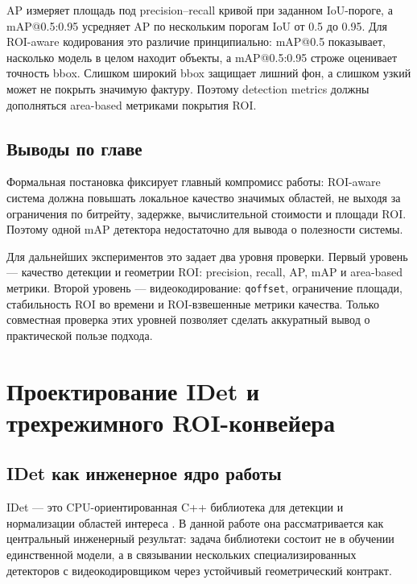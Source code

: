 \documentclass[12pt,a4paper,oneside,openany]{report}
\begin{document}
AP измеряет площадь под precision--recall кривой при заданном IoU-пороге, а mAP@0.5:0.95
усредняет AP по нескольким порогам IoU от 0.5 до 0.95. Для ROI-aware кодирования это различие
принципиально: mAP@0.5 показывает, насколько модель в целом находит объекты, а mAP@0.5:0.95
строже оценивает точность bbox. Слишком широкий bbox защищает лишний фон, а слишком узкий может
не покрыть значимую фактуру. Поэтому detection metrics должны дополняться area-based метриками
покрытия ROI.


\section{Выводы по главе}

Формальная постановка фиксирует главный компромисс работы: ROI-aware система должна повышать
локальное качество значимых областей, не выходя за ограничения по битрейту, задержке,
вычислительной стоимости и площади ROI. Поэтому одной mAP детектора недостаточно для вывода о
полезности системы.

Для дальнейших экспериментов это задает два уровня проверки. Первый уровень --- качество
детекции и геометрии ROI: precision, recall, AP, mAP и area-based метрики. Второй уровень ---
видеокодирование: \texttt{qoffset}, ограничение площади, стабильность ROI во времени и
ROI-взвешенные метрики качества. Только совместная проверка этих уровней позволяет сделать
аккуратный вывод о практической пользе подхода.


\chapter{Проектирование IDet и трехрежимного ROI-конвейера}


\section{IDet как инженерное ядро работы}

IDet --- это CPU-ориентированная C++ библиотека для детекции и нормализации областей интереса
\cite{idet}. В данной работе она рассматривается как центральный инженерный результат: задача
библиотеки состоит не в обучении единственной модели, а в связывании нескольких
специализированных детекторов с видеокодировщиком через устойчивый геометрический контракт.
\end{document}
